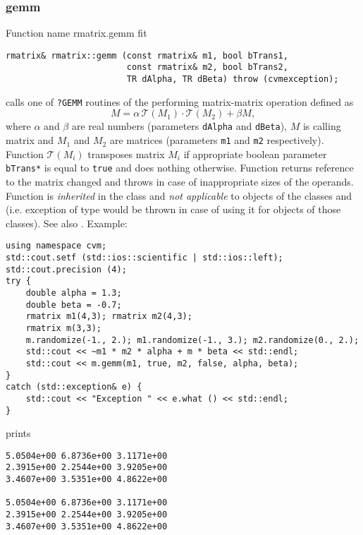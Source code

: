 \subsubsection{gemm}
Function%
\pdfdest name {rmatrix.gemm} fit
\begin{verbatim}
rmatrix& rmatrix::gemm (const rmatrix& m1, bool bTrans1,
                        const rmatrix& m2, bool bTrans2,
                        TR dAlpha, TR dBeta) throw (cvmexception);
\end{verbatim}
calls one of \verb"?GEMM" routines of the
performing 
matrix-matrix operation defined as
\begin{equation*}
M=\alpha\,\mathcal{T}(M_1)\cdot\mathcal{T}(M_2) + \beta M,
\end{equation*}
where $\alpha$ and $\beta$ are real numbers
(parameters \verb"dAlpha" and \verb"dBeta"),
$M$ is  calling matrix
and $M_1$ and $M_2$ are matrices (parameters \verb"m1"
and \verb"m2" respectively). Function $\mathcal{T}(M_i)$
transposes matrix $M_i$ if appropriate boolean
parameter \verb"bTrans*" is equal to \verb"true"
and does nothing otherwise.
Function
returns  reference to the matrix changed and throws
in case of inappropriate sizes of the operands.
Function is \emph{inherited} in the class
 and
\emph{not applicable} to objects of the classes
 and
 (i.e. exception of
type  would be thrown
in case of using it for objects of those classes).
See also
.
Example:
\begin{Verbatim}
using namespace cvm;
std::cout.setf (std::ios::scientific | std::ios::left);
std::cout.precision (4);
try {
    double alpha = 1.3;
    double beta = -0.7;
    rmatrix m1(4,3); rmatrix m2(4,3);
    rmatrix m(3,3);
    m.randomize(-1., 2.); m1.randomize(-1., 3.); m2.randomize(0., 2.);
    std::cout << ~m1 * m2 * alpha + m * beta << std::endl;
    std::cout << m.gemm(m1, true, m2, false, alpha, beta);
}
catch (std::exception& e) {
    std::cout << "Exception " << e.what () << std::endl;
}
\end{Verbatim}
prints
\begin{Verbatim}
5.0504e+00 6.8736e+00 3.1171e+00
2.3915e+00 2.2544e+00 3.9205e+00
3.4607e+00 3.5351e+00 4.8622e+00

5.0504e+00 6.8736e+00 3.1171e+00
2.3915e+00 2.2544e+00 3.9205e+00
3.4607e+00 3.5351e+00 4.8622e+00
\end{Verbatim}
\newpage


